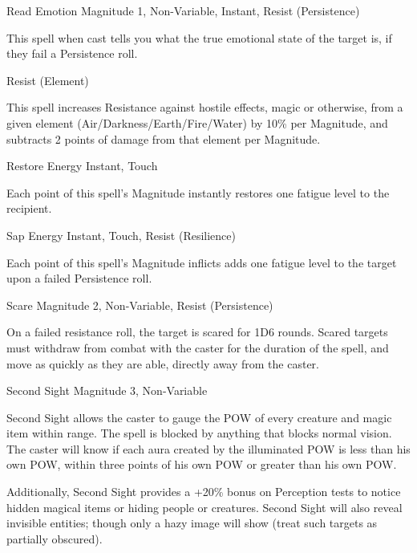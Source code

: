 \begin{rpg-spell}
{Read Emotion}
{Magnitude 1, Non-Variable, Instant, Resist (Persistence)}

This spell when cast tells you what the true emotional state of the target is, if they fail a Persistence roll.
\end{rpg-spell}


\begin{rpg-spell}
{Resist (Element)}
\nopagebreak
{}

This spell increases Resistance against hostile effects, magic or otherwise, from a given element (Air/Darkness/Earth/Fire/Water) by 10\% per Magnitude, and subtracts 2 points of damage from that element per Magnitude.
\end{rpg-spell}


\begin{rpg-spell}
{Restore Energy}
{Instant, Touch}

Each point of this spell’s Magnitude instantly restores one fatigue level to the recipient.
\end{rpg-spell}


\begin{rpg-spell}
{Sap Energy}
{Instant, Touch, Resist (Resilience)}

Each point of this spell’s Magnitude inflicts adds one fatigue level to the target upon a failed Persistence roll.
\end{rpg-spell}


\begin{rpg-spell}
{Scare}
{Magnitude 2, Non-Variable, Resist (Persistence)}

On a failed resistance roll, the target is scared for 1D6 rounds. Scared targets must withdraw from combat with the caster for the duration of the spell, and move as quickly as they are able, directly away from the caster.
\end{rpg-spell}


\begin{rpg-spell}
{Second Sight}
{Magnitude 3, Non-Variable}

Second Sight allows the caster to gauge the POW of every creature and magic item within range. The spell is blocked by anything that blocks normal vision. The caster will know if each aura created by the illuminated POW is less than his own POW, within three points of his own POW or greater than his own POW. 

Additionally, Second Sight provides a +20\% bonus on Perception tests to notice hidden magical items or hiding people or creatures. Second Sight will also reveal invisible entities; though only a hazy image will show (treat such targets as partially obscured). 
\end{rpg-spell}


